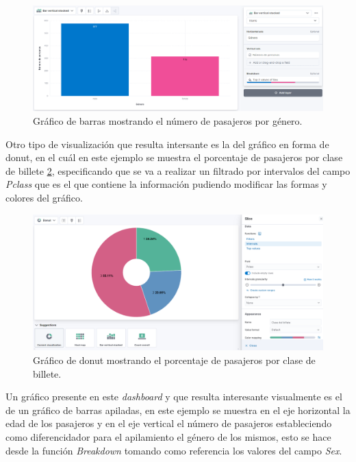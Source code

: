 \begin{figure}
    \centering
    \includegraphics[width=1\linewidth]{img/kibana14.png}
    \caption{Gráfico de barras mostrando el número de pasajeros por género.}
    \label{fig:kibana14}
\end{figure}

Otro tipo de visualización que resulta intersante es la del gráfico en forma de donut, en el cuál en este ejemplo se muestra el porcentaje de pasajeros por clase de billete \ref{fig:kibana15}, especificando que se va a realizar un filtrado por intervalos del campo \textit{Pclass} que es el que contiene la información pudiendo modificar las formas y colores del gráfico.

\begin{figure}
    \centering
    \includegraphics[width=1\linewidth]{img/kibana15.png}
    \caption{Gráfico de donut mostrando el porcentaje de pasajeros por clase de billete.}
    \label{fig:kibana15}
\end{figure}

Un gráfico presente en este \textit{dashboard} y que resulta interesante visualmente es el de un gráfico de barras apiladas, en este ejemplo se muestra en el eje horizontal la edad de los pasajeros y en el eje vertical el número de pasajeros estableciendo como diferencidador para el apilamiento el género de los mismos, esto se hace desde la función \textit{Breakdown} tomando como referencia los valores del campo \textit{Sex}.

